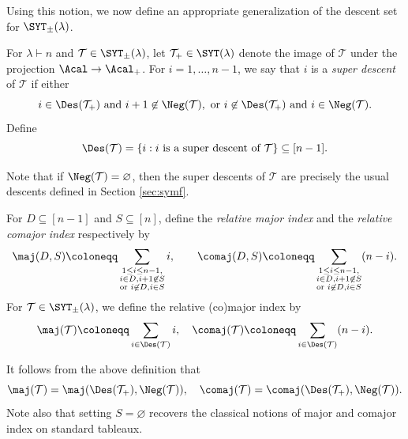Using this notion, we now define an appropriate generalization of the descent set for $\SYT_\pm(\lambda)$.
\begin{defi}
For $\lambda \vdash n$ and $\mathcal{T} \in \SYT_\pm(\lambda)$, let $\mathcal{T}_+ \in \SYT(\lambda)$ denote the image of $\mathcal{T}$ under the projection $\Acal \to \Acal_+$. For $i = 1, \ldots, n-1$, we say that $i$ is a \emph{super descent} of $\mathcal{T}$ if either 
\[
i \in \Des(\mathcal{T}_+) \text{ and } i+1 \not\in \Neg(\mathcal{T}), \text{ or } i \not\in \Des(\mathcal{T}_+) \text{ and } i \in \Neg(\mathcal{T}).
\]
Define
\[
\Des(\mathcal{T}) = \{ i : i \text{ is a super descent of } \mathcal{T} \} \subseteq [n-1].
\]
\end{defi}
Note that if $\Neg(\mathcal{T}) = \varnothing$, then the super descents of $\mathcal{T}$ are precisely the usual descents defined in Section \ref{sec:symf}.

\begin{defi}\label{def:super-maj}
For $D \subseteq [n-1]$ and $S \subseteq [n]$, define the \emph{relative major index} and the \emph{relative comajor index} respectively by
\[
\maj(D,S) \coloneqq \sum_{\substack{1 \le i \le n-1, \\ i \in D, i+1 \not\in S \\ \text{or } i \not\in D, i \in S}} i, \qquad \comaj(D,S) \coloneqq \sum_{\substack{1 \le i \le n-1, \\ i \in D, i+1 \not\in S \\ \text{or } i \not\in D, i \in S}} (n-i).
\]
For $\mathcal{T} \in \SYT_\pm(\lambda)$, we define the relative (co)major index by
\[
\maj(\mathcal{T}) \coloneqq \sum_{i \in \Des(\mathcal{T})} i, \quad \comaj(\mathcal{T}) \coloneqq \sum_{i \in \Des(\mathcal{T})} (n-i).
\]
\end{defi}
It follows from the above definition that
\[
\maj(\mathcal{T}) = \maj(\Des(\mathcal{T}_+),\Neg(\mathcal{T})), \quad \comaj(\mathcal{T}) = \comaj(\Des(\mathcal{T}_+),\Neg(\mathcal{T})).
\]
Note also that setting $S = \varnothing$ recovers the classical notions of major and comajor index on standard tableaux.
